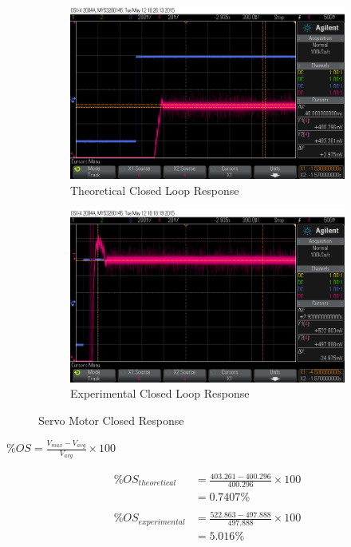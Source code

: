 \documentclass[11pt,a4paper]{article}
\begin{document}
\begin{enumerate}
	\begin{figure}[H]
		\begin{subfigure}{0.5\textwidth}
		\includegraphics[width=0.9\linewidth]{Ossilloscope/PartC_Theoretical_Overshoot.png} 
		\caption{Theoretical Closed Loop Response}
		\label{fig:subim1}
		\end{subfigure}
		\begin{subfigure}{0.5\textwidth}
		\includegraphics[width=0.9\linewidth]{Ossilloscope/PartC_Experimental_Overshoot.png}
		\caption{Experimental Closed Loop Response}
		\label{fig:subim2}
		\end{subfigure} 
	\caption{\label{fig:rand}Servo Motor Closed Response}
	\end{figure}
	
	\begin{center}
		$\%OS = \frac{V_{max} - V_{avg}}{V_{avg}} \times 100$
	\end{center}
	\begin{align*}		
	    \%OS_{theoretical} &= \frac{403.261 - 400.296}{400.296} \times 100 \\
	    &= 0.7407\% \\\\
	    \%OS_{experimental} &= \frac{522.863 - 497.888}{497.888} \times 100 \\
	    &= 5.016\% 
	\end{align*}


\end{enumerate}
\end{document}
